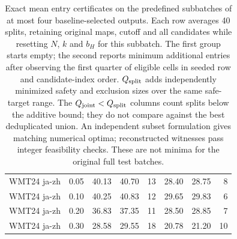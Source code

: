 \begin{table}[t]
\begin{tabular}{lrrrrrrr}
WMT24 ja-zh & 0.05 & 40.13 & 40.70 & 13 & 28.40 & 28.75 & 8 \\
WMT24 ja-zh & 0.10 & 40.25 & 40.83 & 12 & 29.65 & 29.83 & 6 \\
WMT24 ja-zh & 0.20 & 36.83 & 37.35 & 11 & 28.50 & 28.85 & 7 \\
WMT24 ja-zh & 0.30 & 28.58 & 29.55 & 18 & 20.78 & 21.20 & 10 \\
\bottomrule
\end{tabular}
\caption{Exact mean entry certificates on the predefined subbatches of at most four baseline-selected outputs. Each row averages 40 splits, retaining original maps, cutoff and all candidates while resetting $N$, $k$ and $b_H$ for this subbatch. The first group starts empty; the second reports minimum additional entries after observing the first quarter of eligible cells in seeded row and candidate-index order. $Q_{\rm split}$ adds independently minimized safety and exclusion sizes over the same safe-target range. The $Q_{\rm joint}<Q_{\rm split}$ columns count splits below the additive bound; they do not compare against the best deduplicated union. An independent subset formulation gives matching numerical optima; reconstructed witnesses pass integer feasibility checks. These are not minima for the original full test batches.}
\label{tab:joint-small}
\end{table}
